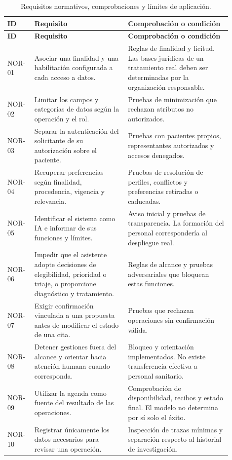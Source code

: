 \small
\setlength{\tabcolsep}{3pt}
\begin{longtable}{L{0.10\linewidth}L{0.38\linewidth}L{0.42\linewidth}}
\caption{Requisitos normativos, comprobaciones y límites de aplicación.}\label{tab:req-normativos}\\
\toprule
\textbf{ID} & \textbf{Requisito} & \textbf{Comprobación o condición} \\
\midrule
\endfirsthead
\toprule
\textbf{ID} & \textbf{Requisito} & \textbf{Comprobación o condición} \\
\midrule
\endhead
NOR-01 & Asociar una finalidad y una habilitación configurada a cada acceso a datos. & Reglas de finalidad y licitud. Las bases jurídicas de un tratamiento real deben ser determinadas por la organización responsable. \\
NOR-02 & Limitar los campos y categorías de datos según la operación y el rol. & Pruebas de minimización que rechazan atributos no autorizados. \\
NOR-03 & Separar la autenticación del solicitante de su autorización sobre el paciente. & Pruebas con pacientes propios, representantes autorizados y accesos denegados. \\
NOR-04 & Recuperar preferencias según finalidad, procedencia, vigencia y relevancia. & Pruebas de resolución de perfiles, conflictos y preferencias retiradas o caducadas. \\
NOR-05 & Identificar el sistema como IA e informar de sus funciones y límites. & Aviso inicial y pruebas de transparencia. La formación del personal correspondería al despliegue real. \\
NOR-06 & Impedir que el asistente adopte decisiones de elegibilidad, prioridad o triaje, o proporcione diagnóstico y tratamiento. & Reglas de alcance y pruebas adversariales que bloquean estas funciones. \\
NOR-07 & Exigir confirmación vinculada a una propuesta antes de modificar el estado de una cita. & Pruebas que rechazan operaciones sin confirmación válida. \\
NOR-08 & Detener gestiones fuera del alcance y orientar hacia atención humana cuando corresponda. & Bloqueo y orientación implementados. No existe transferencia efectiva a personal sanitario. \\
NOR-09 & Utilizar la agenda como fuente del resultado de las operaciones. & Comprobación de disponibilidad, recibos y estado final. El modelo no determina por sí solo el éxito. \\
NOR-10 & Registrar únicamente los datos necesarios para revisar una operación. & Inspección de trazas mínimas y separación respecto al historial de investigación. \\

\end{longtable}
